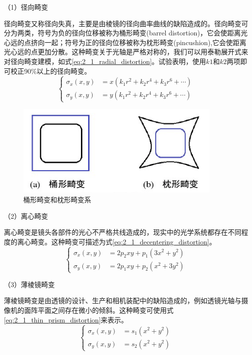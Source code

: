 （1）径向畸变

径向畸变又称径向失真，主要是由棱镜的径向曲率曲线的缺陷造成的。径向畸变可分为两类，符号为负的径向位移被称为桶形畸变(barrel distortion)，它会使距离光心远的点挤向一起；符号为正的径向位移被称为枕形畸变(pincushion),它会使距离光心远的点更加分散。这种畸变关于光轴是严格对称的，我们可以用泰勒展开式来对径向畸变建模，如式\ref{eq:2_1_radial_distortion}。试验表明，使用$k1$和$k2$两项即可校正90\%以上的径向畸变\cite{hartley2003multiple}。
%
\begin{equation}\label{eq:2_1_radial_distortion}
\left\{
\begin{aligned}
\sigma_x(x,y) &= x(k_1 r^2 + k_2 r^4 + k_3 r^6 + \cdots)  \\
\sigma_y(x,y) &= y(k_1 r^2 + k_2 r^4 + k_3 r^6 + \cdots) 
\end{aligned}
\right.
\end{equation}

\begin{figure}[!htb] %
	\centering
	\includegraphics[width=4in]{figures/2_1_radial_distortion}
	\caption{桶形畸变和枕形畸变系}\label{fig:2_1_radial_distortion}
\end{figure}

（2）离心畸变

离心畸变是镜头各部件的光心不严格共线造成的，现实中的光学系统都存在不同程度的离心畸变。这种畸变可描述为式\ref{eq:2_1_decentering_distortion}。
%
\begin{equation}\label{eq:2_1_decentering_distortion}
\left\{
\begin{aligned}
\sigma_x(x,y) &= 2p_2 xy + p_1 (3x^2 + y^2)  \\
\sigma_y(x,y) &= 2p_1 xy + p_2 (x^2+ 3y^2)
\end{aligned}
\right.
\end{equation}

（3）薄棱镜畸变

薄棱镜畸变是由透镜的设计、生产和相机装配中的缺陷造成的，例如透镜光轴与摄像机的面阵平面之间存在微小的倾斜。这种畸变可使用式\ref{eq:2_1_thin_prism_distortion}来表示。
%
\begin{equation}\label{eq:2_1_thin_prism_distortion}
\left\{
\begin{aligned}
\sigma_x(x,y) &= s_1 (x^2 + y^2) \\
\sigma_y(x,y) &= s_2 (x^2 + y^2)
\end{aligned}
\right.
\end{equation}


